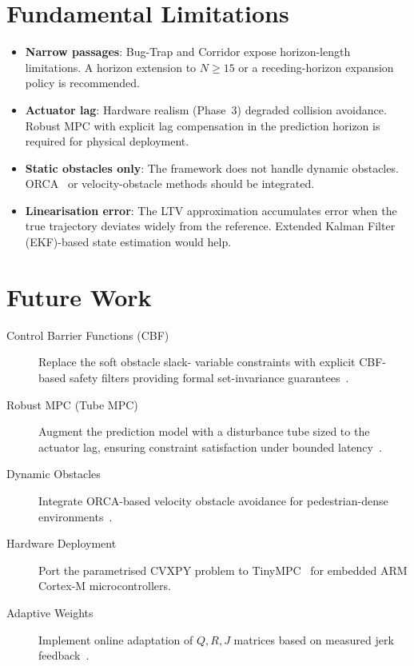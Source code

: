 \documentclass[12pt,a4paper,oneside]{report}
\begin{document}
\section{Fundamental Limitations}

\begin{itemize}
  \item \textbf{Narrow passages}: Bug-Trap and Corridor expose horizon-length
    limitations. A horizon extension to \(N \geq 15\) or a receding-horizon
    expansion policy is recommended.
  \item \textbf{Actuator lag}: Hardware realism (Phase~3) degraded collision
    avoidance. Robust MPC with explicit lag compensation in the prediction
    horizon is required for physical deployment.
  \item \textbf{Static obstacles only}: The framework does not handle dynamic
    obstacles. ORCA~\cite{orca2011} or velocity-obstacle methods should be
    integrated.
  \item \textbf{Linearisation error}: The LTV approximation accumulates
    error when the true trajectory deviates widely from the reference.
    Extended Kalman Filter (EKF)-based state estimation would help.
\end{itemize}

\section{Future Work}

\begin{description}
  \item[Control Barrier Functions (CBF)] Replace the soft obstacle slack-
    variable constraints with explicit CBF-based safety filters providing
    formal set-invariance guarantees~\cite{ali2024}.
  \item[Robust MPC (Tube MPC)] Augment the prediction model with a
    disturbance tube sized to the actuator lag, ensuring constraint
    satisfaction under bounded latency~\cite{mayne2005}.
  \item[Dynamic Obstacles] Integrate ORCA-based velocity obstacle avoidance
    for pedestrian-dense environments~\cite{orca2011}.
  \item[Hardware Deployment] Port the parametrised CVXPY problem to
    TinyMPC~\cite{nguyen2024} for embedded ARM Cortex-M microcontrollers.
  \item[Adaptive Weights] Implement online adaptation of \(Q,R,J\) matrices
    based on measured jerk feedback~\cite{mdpisensors2024}.
\end{description}
\end{document}
